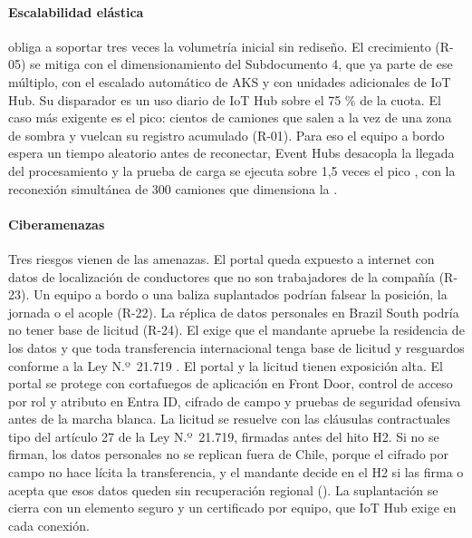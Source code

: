 \paragraph{Escalabilidad elástica}
 obliga a soportar tres veces la volumetría inicial sin rediseño. El crecimiento
(R-05) se mitiga con el dimensionamiento del Subdocumento 4, que ya parte de ese múltiplo, con el escalado
automático de AKS y con unidades adicionales de IoT Hub. Su disparador es un uso diario de IoT Hub sobre
el 75 \% de la cuota. El caso más exigente es el pico: cientos de camiones
que salen a la vez de una zona de sombra y vuelcan su registro acumulado (R-01). Para eso el equipo a
bordo espera un tiempo aleatorio antes de reconectar, Event Hubs desacopla la llegada del procesamiento y
la prueba de carga se ejecuta sobre 1,5 veces el pico , con la reconexión
simultánea de 300 camiones que dimensiona la .

\paragraph{Ciberamenazas}
Tres riesgos vienen de las amenazas. El portal queda expuesto a internet con datos de localización de
conductores que no son trabajadores de la compañía (R-23). Un equipo a bordo o una baliza suplantados
podrían falsear la posición, la jornada o el acople (R-22). La réplica de datos personales en Brazil
South podría no tener base de licitud (R-24). El  exige que el mandante apruebe la residencia
de los datos y que toda transferencia internacional tenga base de licitud y resguardos conforme a la Ley
N.º~21.719 \parencite{ley21719}. El portal y la licitud tienen exposición alta. El portal se protege con
cortafuegos de aplicación en Front Door, control de acceso por rol y atributo en Entra ID, cifrado de
campo y pruebas de seguridad ofensiva antes de la marcha blanca. La licitud se resuelve con las
cláusulas contractuales tipo del artículo 27 de la Ley N.º~21.719, firmadas antes del hito H2. Si no se
firman, los datos personales no se replican fuera de Chile, porque el cifrado por campo no hace lícita
la transferencia, y el mandante decide en el H2 si las firma o acepta que esos datos queden sin
recuperación regional (). La suplantación se cierra con
un elemento seguro y un certificado por equipo, que IoT Hub exige en cada conexión.


